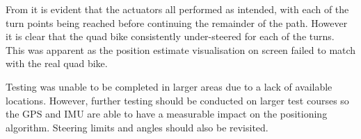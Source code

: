 \documentclass[main.tex]{subfiles}
\begin{document}
From  it is evident that the actuators all performed as intended, with each of the turn points being reached before continuing the remainder of the path. However it is clear that the quad bike consistently under-steered for each of the turns. This was apparent as the position estimate visualisation on screen failed to match with the real quad bike.

Testing was unable to be completed in larger areas due to a lack of available locations. However, further testing should be conducted on larger test courses so the GPS and IMU are able to have a measurable impact on the positioning algorithm. Steering limits and angles should also be revisited.
\end{document}
